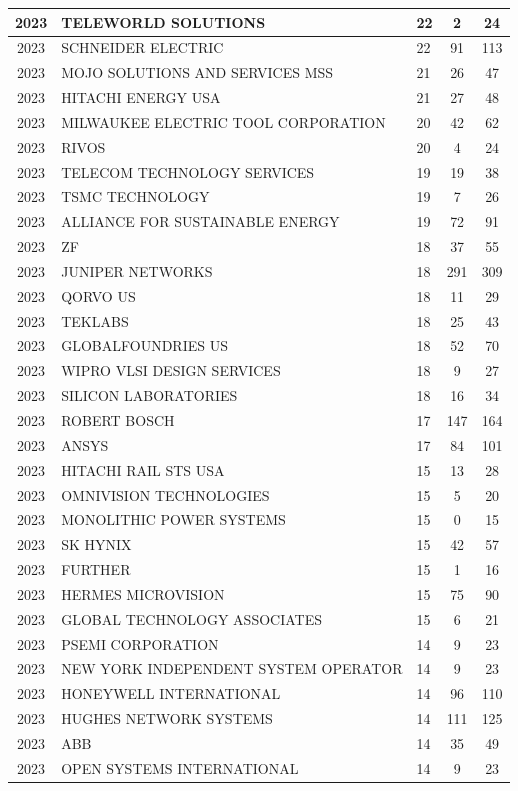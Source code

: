 \documentclass{article}%
\begin{document}
\begin{longtable}{c|p{20em}|p{5em}|c|c}
\hline%
2023&TELEWORLD SOLUTIONS&22&2&24\\%
\hline%
2023&SCHNEIDER ELECTRIC&22&91&113\\%
\hline%
2023&MOJO SOLUTIONS AND SERVICES MSS&21&26&47\\%
\hline%
2023&HITACHI ENERGY USA&21&27&48\\%
\hline%
2023&MILWAUKEE ELECTRIC TOOL CORPORATION&20&42&62\\%
\hline%
2023&RIVOS&20&4&24\\%
\hline%
2023&TELECOM TECHNOLOGY SERVICES&19&19&38\\%
\hline%
2023&TSMC TECHNOLOGY&19&7&26\\%
\hline%
2023&ALLIANCE FOR SUSTAINABLE ENERGY&19&72&91\\%
\hline%
2023&ZF&18&37&55\\%
\hline%
2023&JUNIPER NETWORKS&18&291&309\\%
\hline%
2023&QORVO US&18&11&29\\%
\hline%
2023&TEKLABS&18&25&43\\%
\hline%
2023&GLOBALFOUNDRIES US&18&52&70\\%
\hline%
2023&WIPRO VLSI DESIGN SERVICES&18&9&27\\%
\hline%
2023&SILICON LABORATORIES&18&16&34\\%
\hline%
2023&ROBERT BOSCH&17&147&164\\%
\hline%
2023&ANSYS&17&84&101\\%
\hline%
2023&HITACHI RAIL STS USA&15&13&28\\%
\hline%
2023&OMNIVISION TECHNOLOGIES&15&5&20\\%
\hline%
2023&MONOLITHIC POWER SYSTEMS&15&0&15\\%
\hline%
2023&SK HYNIX&15&42&57\\%
\hline%
2023&FURTHER&15&1&16\\%
\hline%
2023&HERMES MICROVISION&15&75&90\\%
\hline%
2023&GLOBAL TECHNOLOGY ASSOCIATES&15&6&21\\%
\hline%
2023&PSEMI CORPORATION&14&9&23\\%
\hline%
2023&NEW YORK INDEPENDENT SYSTEM OPERATOR&14&9&23\\%
\hline%
2023&HONEYWELL INTERNATIONAL&14&96&110\\%
\hline%
2023&HUGHES NETWORK SYSTEMS&14&111&125\\%
\hline%
2023&ABB&14&35&49\\%
\hline%
2023&OPEN SYSTEMS INTERNATIONAL&14&9&23\\%

\end{longtable}
\end{document}

